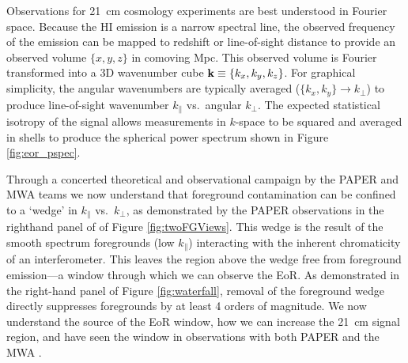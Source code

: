 \documentclass[preprint]{aastex}
\def\kperp{k_{\bot}}
\def\kpar{k_{\|}}
\def\kperp{k_{\bot}}
\def\kpar{k_{\|}}
\def\k{{\bf k}}
\def\HI{{H{\small I }}}
\begin{document}
Observations for 21~cm cosmology experiments are best understood in
Fourier space.  Because the \HI emission is a
narrow spectral line, the observed frequency of the emission can be mapped to
redshift or line-of-sight distance to provide an observed volume $\{x,y,z\}$ in
comoving Mpc. This observed volume is Fourier transformed into a 3D
wavenumber cube $\k\equiv\{k_{x}, k_{y}, k_{z}\}$. For graphical simplicity, the angular
wavenumbers are typically averaged ($\{k_{x},k_{y}\}\rightarrow\kperp$) to
produce line-of-sight wavenumber $\kpar$ vs.\ angular $\kperp$. 
The expected statistical isotropy of the signal allows measurements in $k$-space to be
squared and averaged in shells to produce the spherical power spectrum
shown in Figure \ref{fig:eor_pspec}.

Through a concerted theoretical and observational campaign by the PAPER and MWA teams
\citep{morales_et_al2012,parsons_et_al2012b,vedantham_2012,Datta_2010,hazelton_et_al2013,pober_et_al2013,parsons_et_al2013,dillon_et_al2013b}
we now understand that foreground contamination can be confined to a `wedge' in
$\kpar$ vs.\ $\kperp$, as demonstrated by the PAPER observations in the
righthand panel of of Figure \ref{fig:twoFGViews}. 
This wedge is the result of
the smooth spectrum foregrounds 
(low $\kpar$) interacting with the inherent
chromaticity of an interferometer. 
This leaves the region above the wedge free from 
foreground emission---a window through which we can observe the EoR. 
As demonstrated in the right-hand panel of Figure \ref{fig:waterfall}, removal of the foreground wedge 
directly suppresses foregrounds by at least 4 orders of magnitude.
We now understand the source of the EoR window, how we can increase the 21~cm signal region, and have seen the window in observations with both PAPER and the MWA \citep{pober_et_al2013,dillon_et_al2013b}.
\end{document}
